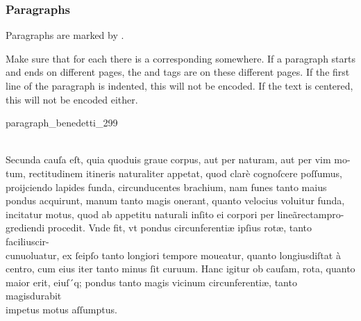 \subsubsection{Paragraphs}
\label{section paragraphs}

\begin{mainrule}
Paragraphs are marked by .
\end{mainrule}

\begin{clarification}
Make sure that for each  there is a corresponding  somewhere. If a paragraph starts and ends on different pages, the  and  tags are on these different pages.
If the first line of the paragraph is indented, this will not be encoded. If the text is centered, this will not be encoded either.
\end{clarification}

\begin{sampleImage}{paragraph_benedetti_299}
\begin{typeLatin}
\untranscribedText {} \\
Secunda cauſa eſt, quia quoduis graue corpus, aut per naturam, aut per vim mo- \\
tum, rectitudinem itineris naturaliter appetat, quod clarè cognoſcere poſſumus, \\
proijciendo lapides funda,  circunducentes brachium, nam funes tanto maius \\
pondus acquirunt,  manum tanto magis onerant, quanto velocius voluitur funda, \\
 incitatur motus, quod ab appetitu naturali inſito ei corpori per lineã\lwr rectampro- \\
grediendi procedit. Vnde fit, vt pondus circunferentiæ ipſius rotæ, tanto facilius\lwr cir- \\
cunuoluatur,  ex ſeipſo tanto longiori tempore moueatur, quanto longius\lwr diſtat à \\
centro, cum eius iter tanto minus ſit curuum. Hanc igitur ob cauſam, rota, quanto \\
maior erit, eiuſ\bs´q; pondus tanto magis vicinum circunferentiæ, tanto magis\lwr durabit \\
impetus motus aſſumptus. \\
 \untranscribedText
\end{typeLatin}
\end{sampleImage}

